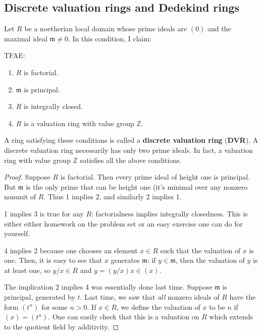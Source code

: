 \subsection{Discrete valuation rings and Dedekind rings}
\begin{example} 
Let $R$ be a noetherian local domain whose prime ideals are $(0)$ and the maximal
ideal 
$\mathfrak{m} \neq 0$. In this condition, I claim:
\begin{proposition} 
TFAE:
\begin{enumerate}
\item $R$ is factorial.
\item $\mathfrak{m}$ is principal.
\item  $R$ is integrally closed.
\item $R$ is a valuation ring with value group $\mathbb{Z}$. 
\end{enumerate}
\end{proposition} 
\begin{definition} 
A ring satisfying these conditions is called a \textbf{discrete valuation
ring} (\textbf{DVR}).
A discrete valuation ring necessarily has only two prime ideals. In fact, a
valuation ring with value group $\mathbb{Z}$ satisfies all the above conditions. 
\end{definition} 
\begin{proof} 
Suppose $R$ is factorial. Then every prime ideal of height one is principal.
But $\mathfrak{m}$ is the only prime that can be height one (it's minimal over
any nonzero nonunit of $R$. Thus 1 implies 2, and similarly 2 implies 1.

1 implies 3 is true for any $R$: factorialness implies integrally closedness.
This is either either homework on the problem set or an easy exercise one can
do for yourself. 

4 implies 2 because one chooses an element $x \in R$ such that the valuation of
$x$ is one. Then, it is easy to see that $x$ generates $\mathfrak{m}$: if $y
\in \mathfrak{m}$, then the valuation of $y$ is at least one, so $y/x \in R$
and $y = (y/x)x \in (x)$. 

The implication 2 implies 4 was essentially done last time. Suppose
$\mathfrak{m}$ is principal, generated by $t$. Last time, we saw that
\emph{all} nonzero ideals of $R$ have the form $(t^n)$ for some $n>0$.  If $x
\in R$, we define the valuation of $x$ to be $n$ if $(x) = (t^n)$. One can
easily check that this is a valuation on $R$ which extends to the quotient
field by additivity.


\end{proof}
\end{example}
